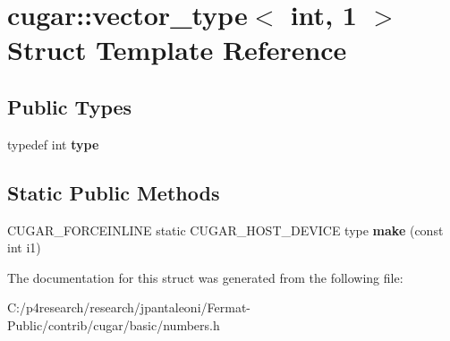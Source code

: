 \hypertarget{structcugar_1_1vector__type_3_01int_00_011_01_4}{}\section{cugar\+:\+:vector\+\_\+type$<$ int, 1 $>$ Struct Template Reference}
\label{structcugar_1_1vector__type_3_01int_00_011_01_4}
\subsection*{Public Types}
\begin{DoxyCompactItemize}
\item 
\mbox{\label{structcugar_1_1vector__type_3_01int_00_011_01_4_acb076a461e25be42cd84a229f02d86ef}} 
typedef int {\bfseries type}
\end{DoxyCompactItemize}
\subsection*{Static Public Methods}
\begin{DoxyCompactItemize}
\item 
\mbox{\label{structcugar_1_1vector__type_3_01int_00_011_01_4_a3c697daa9d4187197fc53a7530e4289a}} 
C\+U\+G\+A\+R\+\_\+\+F\+O\+R\+C\+E\+I\+N\+L\+I\+NE static C\+U\+G\+A\+R\+\_\+\+H\+O\+S\+T\+\_\+\+D\+E\+V\+I\+CE type {\bfseries make} (const int i1)
\end{DoxyCompactItemize}


The documentation for this struct was generated from the following file\+:\begin{DoxyCompactItemize}
\item 
C\+:/p4research/research/jpantaleoni/\+Fermat-\/\+Public/contrib/cugar/basic/numbers.\+h\end{DoxyCompactItemize}
